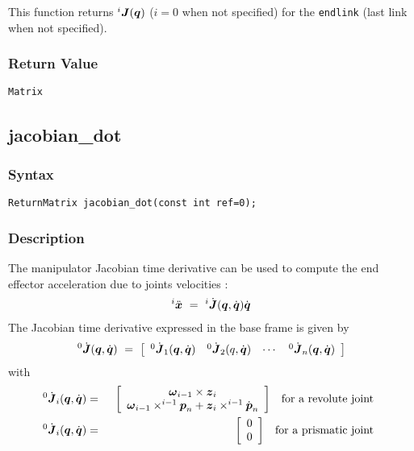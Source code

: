 \documentclass[dvips,11pt,fleqn]{report}
\newcommand{\mbold}[1]{\mbox{\boldmath $ #1 $}}
\begin{document}
This function returns ${}^i \mbold{J}(\mbold{q})$ ($i=0$ when not
specified) for the \texttt{endlink} (last link when not specified).



\subsubsection*{Return Value}

{\tt Matrix}

\newpage


\subsection*{jacobian\_dot}
\subsubsection*{Syntax}
\begin{verbatim}
ReturnMatrix jacobian_dot(const int ref=0);
\end{verbatim}
\subsubsection*{Description}   
The manipulator Jacobian time derivative can be used to compute the end effector acceleration due to joints velocities \cite{Angeles97}:
\begin{eqnarray}
  ^i\ddot{\mbold{x}}\ =\  ^i\dot{\mbold{J}}(\mbold{q},\dot{\mbold{q}})\dot{\mbold{q}}
\end{eqnarray}
The Jacobian time derivative expressed in the base frame is given by \cite{Angeles97}
\begin{eqnarray}
  ^0\dot{\mbold{J}}(\mbold{q},\dot{\mbold{q}})\ =\ 
  \left[
    \begin{array}{cccc}
      ^0\dot{\mbold{J}}_1(\mbold{q},\dot{\mbold{q}}) & ^0\dot{\mbold{J}}_2(q,\dot{\mbold{q}}) 
      & \cdots & ^0\dot{\mbold{J}}_n(\mbold{q},\dot{\mbold{q}})
    \end{array}
  \right]
\end{eqnarray}
with
\begin{eqnarray}
  ^0\dot{\mbold{J}}_i(\mbold{q},\dot{\mbold{q}}) &=&
  \begin{array}{cc}
    \left[
      \begin{array}{c}
        \mbold{\omega}_{i-1}\times \mbold{z}_i \\
        \mbold{\omega}_{i-1}\times ^{i-1}\mbold{p}_n + \mbold{z}_i\times ^{i-1}\dot{\mbold{p}}_n
      \end{array}
    \right]  & \textrm{for a revolute joint}
  \end{array} \\
  ^0\dot{\mbold{J}}_i(\mbold{q},\dot{\mbold{q}}) &=&
  \begin{array}{cc}
    \left[
      \begin{array}{c}
        0 \\
        0
      \end{array}
    \right]  & \textrm{for a prismatic joint}
  \end{array}
\end{eqnarray}
\end{document}
